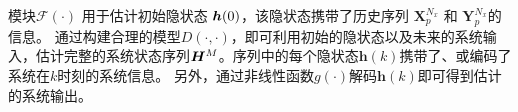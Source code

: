 模块$\mathcal{F}(\cdot)$ 用于估计初始隐状态 $\boldsymbol h(0)$，该隐状态携带了历史序列 $\boldsymbol X_p^{N_x} \text{ 和 } \boldsymbol Y_p^{N_x}$的信息。
通过构建合理的模型$D(\cdot, \cdot)$，即可利用初始的隐状态以及未来的系统输入，估计完整的系统状态序列$\boldsymbol H^M$。序列中的每个隐状态$\boldsymbol h(k)$携带了、或编码了系统在$k$时刻的系统信息。
另外，通过非线性函数$g(\cdot)$解码$\boldsymbol h(k)$即可得到估计的系统输出。


